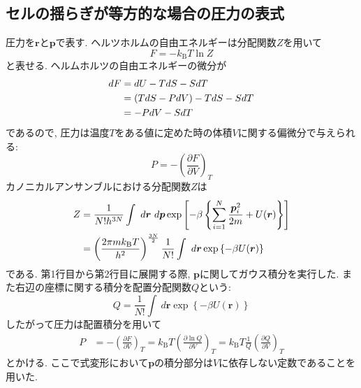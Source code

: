 
\subsection{セルの揺らぎが等方的な場合の圧力の表式}
圧力を$\bm{r}$と$\bm{p}$で表す.
ヘルツホルムの自由エネルギーは分配関数$Z$を用いて
\begin{equation}
 F = -k_{\mathrm{B}} T \ln Z
\end{equation}
と表せる. ヘルムホルツの自由エネルギーの微分が
\begin{align}
 dF &= dU - TdS - SdT           \notag \\
    &= (TdS - PdV) - TdS - SdT  \notag \\
    &= -PdV -S dT               \notag
\end{align}
であるので, 圧力は温度$T$をある値に定めた時の体積$V$に関する偏微分で与えられる:
\begin{equation}
 P = -\left(\frac{\partial F}{\partial V}\right)_{T}
\end{equation}
カノニカルアンサンブルにおける分配関数$Z$は
\begin{align}
  Z
&=\frac{1}{N! h^{3N}}
  \int ~d\bm{r}~d\bm{p}
  \exp \left[ -\beta \left\{ \sum_{i=1}^{N} \frac{\bm{p}_{i}^{2}}{2m} + U(\bm{r}) \right\}\right]
  \notag
  \\
&=\left(\frac{2 \pi m k_{\mathrm{B}} T}{h^{2}}\right)^{\frac{3N}{2}}
  \frac{1}{N!}
  \int ~d\bm{r} \exp\left\{-\beta U(\bm{r}) \right\}
\end{align}
である.
第1行目から第2行目に展開する際, $\bm{p}$に関してガウス積分を実行した.
また右辺の座標に関する積分を配置分配関数$Q$という:
\begin{equation}
 Q
=\frac{1}{N!}
 \int ~d\bm{r} \exp\left\{-\beta U(\bm{r}) \right\}
\end{equation}
したがって圧力は配置積分を用いて
\begin{align}
  P
&=-\left(\frac{\partial F}{\partial V}\right)_{T}
 =k_{\mathrm{B}} T \left(\frac{\partial \ln Q}{\partial V}\right)_{T}
 =k_{\mathrm{B}} T \frac{1}{Q} \left(\frac{\partial Q}{\partial V}\right)_{T}
\end{align}
とかける.
ここで式変形において$\bm{p}$の積分部分は$V$に依存しない定数であることを用いた.
